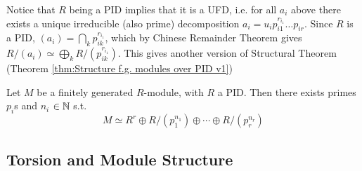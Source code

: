 \documentclass{article}
\begin{document}
\begin{remark}
    Notice that $R$ being a PID implies that it is a UFD, i.e. for all $a_i$ above there exists a unique irreducible (also prime) decomposition $a_i = u_i p_{i1}^{r_{i_1}} \ldots p_{ir}$. Since $R$ is a PID, $(a_i) = \bigcap_k p_{ik}^{r_{i_1}}$, which by Chinese Remainder Theorem gives $R/(a_i) \simeq \bigoplus_k R/(p_{ik}^{r_{i_1}})$. This gives another version of Structural Theorem (Theorem \ref{thm:Structure f.g. modules over PID v1})
\end{remark}

\begin{theorem}[Structure, v2]\label{thm:Structure f.g. modules over PID v2}
    Let $M$ be a finitely generated $R$-module, with $R$ a PID. Then there exists primes $p_i$s and $n_i$ $\in \mathbb{N}$ s.t. 
    \[
        M \simeq R^r \oplus R/(p_1^{n_1}) \oplus \cdots \oplus R/(p_r^{n_r})
    \]
\end{theorem}

\subsection{Torsion and Module Structure}
\end{document}
